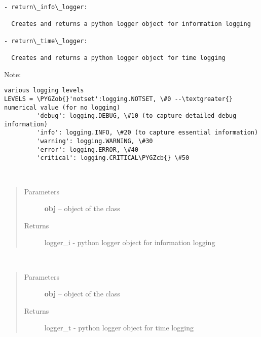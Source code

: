\documentclass[letterpaper,10pt,english]{sphinxmanual}
\def\PYGZob{\char`\{}
\def\PYGZcb{\char`\}}
\begin{document}
\begin{Verbatim}[commandchars=\\\{\}]
- return\_info\_logger:
  
  Creates and returns a python logger object for information logging
  
- return\_time\_logger:
  
  Creates and returns a python logger object for time logging
\end{Verbatim}

Note:

\begin{Verbatim}[commandchars=\\\{\}]
various logging levels
LEVELS = \PYGZob{}'notset':logging.NOTSET, \#0 --\textgreater{} numerical value (for no logging)
         'debug': logging.DEBUG, \#10 (to capture detailed debug information)
         'info': logging.INFO, \#20 (to capture essential information)
         'warning': logging.WARNING, \#30
         'error': logging.ERROR, \#40
         'critical': logging.CRITICAL\PYGZcb{} \#50
\end{Verbatim}

\begin{fulllineitems}
\label{index:brake.initialize.logger.return_info_logger}~\begin{quote}\begin{description}
\item[{Parameters}] \leavevmode
\textbf{obj} -- object of the class 

\item[{Returns}] \leavevmode
logger\_i - python logger object for information logging

\end{description}\end{quote}

\end{fulllineitems}


\begin{fulllineitems}
\label{index:brake.initialize.logger.return_time_logger}~\begin{quote}\begin{description}
\item[{Parameters}] \leavevmode
\textbf{obj} -- object of the class 

\item[{Returns}] \leavevmode
logger\_t - python logger object for time logging

\end{description}\end{quote}

\end{fulllineitems}
\end{document}
